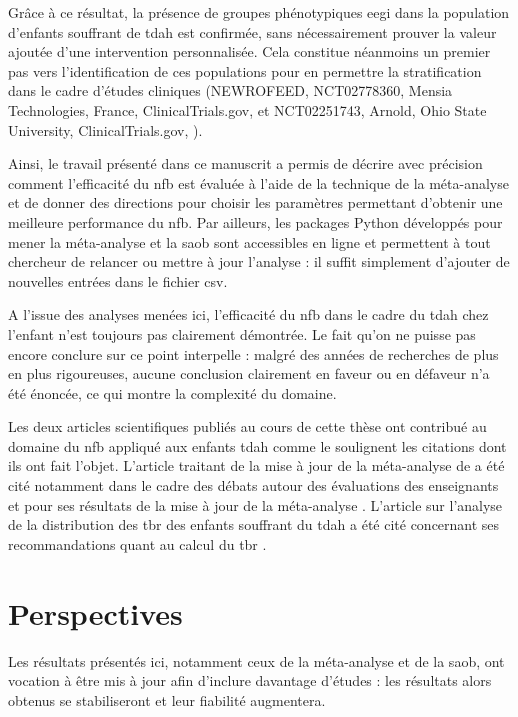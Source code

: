 Grâce à ce résultat, la présence de 
groupes phénotypiques \gls{eegi} dans la population d'enfants souffrant de \gls{tdah} est confirmée, sans nécessairement prouver la valeur ajoutée d'une 
intervention personnalisée. Cela constitue néanmoins un premier pas vers l'identification de ces populations pour en 
permettre la stratification dans le cadre d'études cliniques (NEWROFEED, NCT02778360, Mensia Technologies, France, ClinicalTrials.gov, \citet{Bioulac2019} et NCT02251743, Arnold, Ohio State University, 
ClinicalTrials.gov, \citet{Kerson2013}).

Ainsi, le travail présenté dans ce manuscrit a permis de décrire avec précision comment l'efficacité du \gls{nfb} est évaluée à l'aide de 
la technique de la méta-analyse et de donner des 
directions pour choisir les paramètres permettant d'obtenir une meilleure performance du \gls{nfb}. Par ailleurs, les packages Python développés pour mener 
la méta-analyse et la \gls{saob}
sont accessibles en ligne et permettent à tout chercheur de relancer ou mettre à jour l'analyse : il suffit simplement d'ajouter de nouvelles 
entrées dans le fichier \gls{csv}.

A l'issue des analyses menées ici, l'efficacité du \gls{nfb} dans le cadre du \gls{tdah} chez l'enfant n'est toujours pas clairement démontrée. 
Le fait qu'on ne puisse pas encore conclure sur ce point interpelle : malgré des années de recherches de plus en plus rigoureuses, aucune conclusion
clairement en faveur ou en défaveur n'a été énoncée, ce qui montre la complexité du domaine.   

Les deux articles scientifiques publiés au cours de cette thèse ont contribué au domaine du \gls{nfb} appliqué aux enfants \gls{tdah}
comme le soulignent les citations dont ils ont fait l'objet. L'article traitant de la mise à jour de la méta-analyse de \citet{Cortese2016} 
\citep{Bussalb2019clinical} a été cité notamment dans le cadre des débats autour des évaluations des enseignants \citep{Bottinger2020} et pour ses résultats
de la mise à jour de la méta-analyse \citep{Bluschke2020}. L'article sur l'analyse de la distribution des \gls{tbr} des enfants souffrant du \gls{tdah} 
\citep{Bussalb2019clinical}
a été cité concernant ses recommandations quant au calcul du \gls{tbr} \citep{Bioulac2020}. 

\section{Perspectives}

Les résultats présentés ici, notamment ceux de la méta-analyse et de la \gls{saob}, ont vocation à être mis à jour afin d'inclure davantage 
d'études : les résultats alors obtenus se stabiliseront et leur fiabilité augmentera.   


